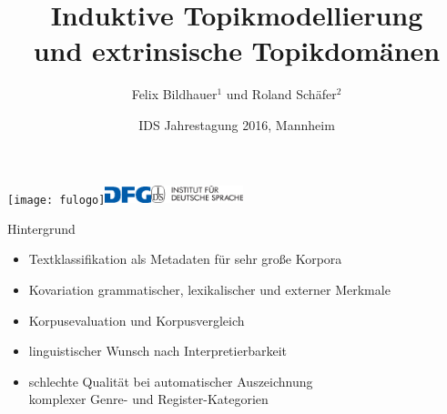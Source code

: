 \documentclass{beamer}
\title[Topikmodellierung und -domänen]{Induktive Topikmodellierung\\und extrinsische Topikdomänen}
\author[Felix Bildhauer, Roland Schäfer]{Felix Bildhauer$^1$ und Roland Schäfer$^2$}
\institute[]{$^1$Abt.\ Grammatik IDS Mannheim, $^2$Ling.\ Webcharakterisierung (DFG) FU Berlin}
\date[]{IDS Jahrestagung 2016, Mannheim}
\begin{document}

\begin{frame}
\texttt{[image: fulogo]}\hspace{0.05\textwidth}\includegraphics[width=0.10\textwidth]{dfglogo}\hspace{0.4
\textwidth}\includegraphics[width=0.2\textwidth]{idslogo}
  \maketitle
\end{frame}



\begin{frame}
  {Hintergrund}
  \begin{itemize}
    \item \alert{Textklassifikation} als \alert{Metadaten} für sehr große Korpora
    \item \alert{Kovariation} grammatischer, lexikalischer und externer Merkmale
    \item \alert{Korpusevaluation} und Korpusvergleich\\
      \citep{Kilgarriff2001,BiemannEa2013,SchaeferBildhauer2013de}
    \item linguistischer Wunsch nach \alert{Interpretierbarkeit}
    \item schlechte Qualität bei automatischer Auszeichnung\\
      komplexer Genre- und Register-Kategorien \citep{BiberEgbert2016}
  \end{itemize}
\end{frame}
\end{document}
